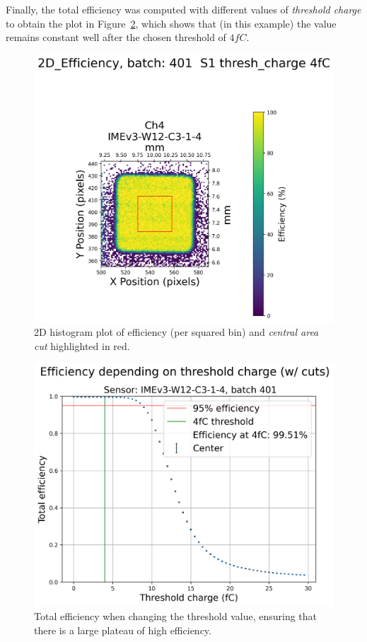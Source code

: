 Finally, the total efficiency was computed with different values of \textit{threshold charge} to obtain the plot in Figure~\ref{fig:efficiency_depending_threshold}, which shows that (in this example) the value remains constant well after the chosen threshold of \(4\si{fC}\).

\begin{figure}[h!tbp]
    \centering
    \includegraphics[width=0.7\linewidth]{Images/efficiency_plots/2D Efficiency_401_S1_with_center_highlight_DUTs_3.png}
    \captionsetup{width=\captionwidth}
    \caption{2D histogram plot of efficiency (per squared bin) and \textit{central area cut} highlighted in red.}
    \label{fig:efficiency_2D_plot}
\end{figure}

\begin{figure}[h!tbp]
    \centering
    \includegraphics[width=0.5\linewidth]{Images/efficiency_plots/Efficiency depending on threshold charge (with cuts) batch 401 S1.png}
    \caption{Total efficiency when changing the threshold value, ensuring that there is a large plateau of high efficiency.}
    \label{fig:efficiency_depending_threshold}
\end{figure}


